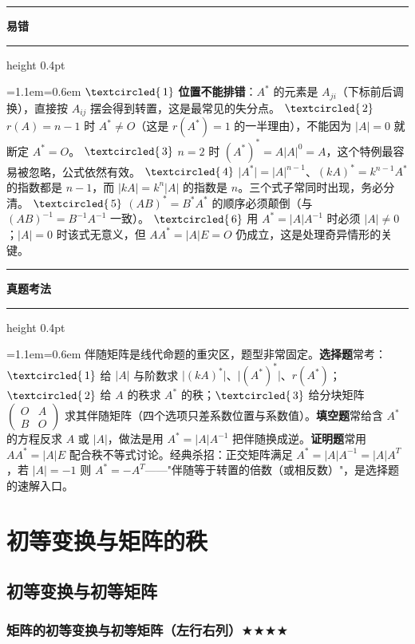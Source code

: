 \documentclass[11pt,openany,UTF8]{ctexbook}
\newcommand{\circled}[1]{\textcircled{\scriptsize\,#1}}
\newcommand{\callouthead}[2]{%
  \par\addvspace{7pt}\noindent
  {\color{#1}\rule[-0.15em]{3pt}{1.05em}}\hspace{0.5em}%
  {\bfseries\color{#1}#2}\par\nobreak\vspace{-0.35em}%
  {\color{rulesep}\hrule height 0.4pt}\nobreak\vspace{0.45em}%
  \begingroup\small\setlength{\parindent}{0pt}%
  \leftskip=1.1em\rightskip=0.6em\noindent\ignorespaces}
\newcommand{\calloutend}{\par\endgroup\addvspace{7pt}}
\newenvironment{callwarn}[1]{\callouthead{warnbar}{#1}}{\calloutend}
\newenvironment{callexam}[1]{\callouthead{exambar}{#1}}{\calloutend}
\begin{document}
\begin{callwarn}{易错}
$\circled{1}$ \textbf{位置不能排错}：$A^*$ 的元素是 $A_{ji}$（下标前后调换），直接按 $A_{ij}$ 摆会得到转置，这是最常见的失分点。 $\circled{2}$ $r(A)=n-1$ 时 \textbf{$A^*\ne O$}（这是 $r(A^*)=1$ 的一半理由），不能因为 $\vert A\vert=0$ 就断定 $A^*=O$。 $\circled{3}$ $n=2$ 时 $(A^*)^*=A\vert A\vert^{0}=A$，这个特例最容易被忽略，公式依然有效。 $\circled{4}$ $\vert A^*\vert=\vert A\vert^{n-1}$、$(kA)^*=k^{n-1}A^*$ 的指数都是 $n-1$，而 $\vert kA\vert=k^n\vert A\vert$ 的指数是 $n$。三个式子常同时出现，务必分清。 $\circled{5}$ $(AB)^*=B^*A^*$ 的顺序必须颠倒（与 $(AB)^{-1}=B^{-1}A^{-1}$ 一致）。 $\circled{6}$ 用 $A^*=\vert A\vert A^{-1}$ 时必须 $\vert A\vert\ne0$；$\vert A\vert=0$ 时该式无意义，但 $AA^*=\vert A\vert E=O$ 仍成立，这是处理奇异情形的关键。

\end{callwarn}

\begin{callexam}{真题考法}
伴随矩阵是线代命题的重灾区，题型非常固定。\textbf{选择题}常考：$\circled{1}$ 给 $\vert A\vert$ 与阶数求 $\vert (kA)^*\vert$、$\vert (A^*)^*\vert$、$r(A^*)$；$\circled{2}$ 给 $A$ 的秩求 $A^*$ 的秩；$\circled{3}$ 给分块矩阵 $\begin{pmatrix}O&A\\B&O\end{pmatrix}$ 求其伴随矩阵（四个选项只差系数位置与系数值）。\textbf{填空题}常给含 $A^*$ 的方程反求 $A$ 或 $\vert A\vert$，做法是用 $A^*=\vert A\vert A^{-1}$ 把伴随换成逆。\textbf{证明题}常用 $AA^*=\vert A\vert E$ 配合秩不等式讨论。经典杀招：正交矩阵满足 $A^*=\vert A\vert A^{-1}=\vert A\vert A^T$，若 $\vert A\vert=-1$ 则 $A^*=-A^T$——"伴随等于转置的倍数（或相反数）"，是选择题的速解入口。

\end{callexam}

\section{初等变换与矩阵的秩}

\subsection{初等变换与初等矩阵}

\subsubsection{矩阵的初等变换与初等矩阵（左行右列）$\bigstar$$\bigstar$$\bigstar$$\bigstar$}
\end{document}
